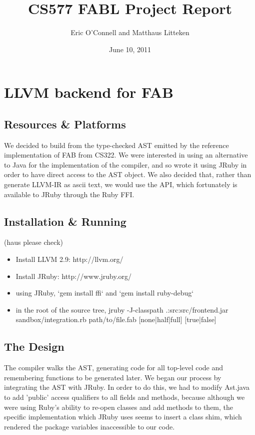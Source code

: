 \documentclass[11pt]{article} %
\title{CS577 FABL Project Report}
\author{Eric O'Connell and Matthaus Litteken}
\date{June 10, 2011}
\begin{document}
\maketitle

\section{LLVM backend for FAB}

\subsection{Resources \& Platforms}
We decided to build from the type-checked AST emitted by the reference implementation of FAB from CS322. We were interested in using an alternative to Java for the implementation of the compiler, and so wrote it using JRuby in order to have direct access to the AST object. We also decided that, rather than generate LLVM-IR as ascii text, we would use the API, which fortunately is available to JRuby through the Ruby FFI.

\subsection{Installation \& Running}

(haus please check)
\begin{itemize}
\item{Install LLVM 2.9: http://llvm.org/}
\item{Install JRuby: http://www.jruby.org/}
\item{using JRuby, `gem install ffi` and `gem install ruby-debug`}
\item{in the root of the source tree, jruby -J-classpath .:src:src/frontend.jar sandbox/integration.rb path/to/file.fab [none|half|full] [true|false]}
\end{itemize}

\subsection{The Design}

The compiler walks the AST, generating code for all top-level code and remembering functions to be generated later. We began our process by integrating the AST with JRuby. In order to do this, we had to modify Ast.java to add 'public' access qualifiers to all fields and methods, because although we were using Ruby's ability to re-open classes and add methods to them, the specific implementation which JRuby uses seems to insert a class shim, which rendered the package variables inaccessible to our code.
\end{document}
